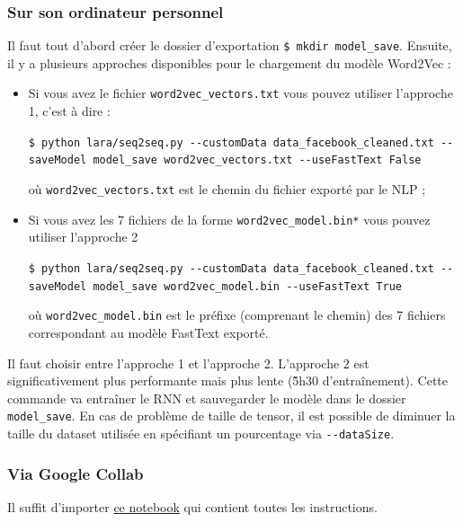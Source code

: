 \documentclass[10pt,a4paper]{article}
\begin{document}
\subsubsection{Sur son ordinateur personnel}
Il faut tout d'abord créer le dossier d'exportation \texttt{\$ mkdir model\_save}. Ensuite, il y a plusieurs approches disponibles pour le chargement du modèle Word2Vec :
\begin{itemize}
    \item Si vous avez le fichier \texttt{word2vec\_vectors.txt} vous pouvez utiliser l'approche 1, c'est à dire :
    \begin{center}
    	\texttt{\$ python lara/seq2seq.py -{}-customData data\_facebook\_cleaned.txt -{}-saveModel model\_save  word2vec\_vectors.txt -{}-useFastText False}
    \end{center}
    où \texttt{word2vec\_vectors.txt} est le chemin du fichier exporté par le NLP ;
    \item Si vous avez les 7 fichiers de la forme \texttt{word2vec\_model.bin*} vous pouvez utiliser l'approche 2
    \begin{center}
    	\texttt{\$ python lara/seq2seq.py -{}-customData data\_facebook\_cleaned.txt -{}-saveModel model\_save  word2vec\_model.bin -{}-useFastText True}
    \end{center}
    où \texttt{word2vec\_model.bin} est le préfixe (comprenant le chemin) des 7 fichiers correspondant au modèle FastText exporté.
\end{itemize}
Il faut choisir entre l'approche 1 et l'approche 2. L'approche 2 est significativement plus performante mais plus lente (\~5h30 d'entraînement). Cette commande va entraîner le RNN et sauvegarder le modèle dans le dossier \texttt{model\_save}. En cas de problème de taille de tensor, il est possible de diminuer la taille du dataset utilisée en spécifiant un pourcentage via \texttt{-{}-dataSize}.

\subsubsection{Via Google Collab}
Il suffit d'importer \href{https://github.com/LaraProject/notebooks/blob/master/LaraProject_RNN.ipynb}{ce notebook} qui contient toutes les instructions.
\end{document}
